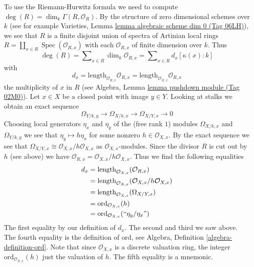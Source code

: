 \documentclass{amsart}
\theoremstyle{plain}
\theoremstyle{definition}
\theoremstyle{remark}
\numberwithin{equation}{subsection}
\def\Spec{\mathop{\mathrm{Spec}}}
\begin{document}
\medskip\noindent
To use the Riemann-Hurwitz formula we need to compute
$\deg(R) = \dim_k \Gamma(R, \mathcal{O}_R)$. By the structure
of zero dimensional schemes over $k$ (see for example
Varieties, Lemma \href{https://stacks.math.columbia.edu/tag/06LH}{lemma algebraic scheme dim 0 (Tag 06LH)}),
we see that $R$ is a finite disjoint union of spectra of
Artinian local rings $R = \coprod_{x \in R} \Spec(\mathcal{O}_{R, x})$
with each $\mathcal{O}_{R, x}$ of finite dimension over $k$. Thus
$$
\deg(R) = \sum\nolimits_{x \in R} \dim_k \mathcal{O}_{R, x} =
\sum\nolimits_{x \in R} d_x [\kappa(x) : k]
$$
with
$$
d_x = \text{length}_{\mathcal{O}_{R, x}} \mathcal{O}_{R, x} =
\text{length}_{\mathcal{O}_{X, x}} \mathcal{O}_{R, x}
$$
the multiplicity of $x$ in $R$
(see Algebra, Lemma \href{https://stacks.math.columbia.edu/tag/02M0}{lemma pushdown module (Tag 02M0)}).
Let $x \in X$ be a closed point with image $y \in Y$.
Looking at stalks we obtain an exact sequence
$$
\Omega_{Y/k, y} \to \Omega_{X/k, x} \to \Omega_{X/Y, x} \to 0
$$
Choosing local generators $\eta_x$ and $\eta_y$ of the
(free rank $1$) modules $\Omega_{X/k, x}$ and $\Omega_{Y/k, y}$
we see that
$
\eta_y \mapsto h \eta_x
$
for some nonzero $h \in \mathcal{O}_{X, x}$. By the exact sequence we see that
$\Omega_{X/Y, x} \cong \mathcal{O}_{X, x}/h\mathcal{O}_{X, x}$
as $\mathcal{O}_{X, x}$-modules. Since the divisor
$R$ is cut out by $h$ (see above) we have
$\mathcal{O}_{R, x} = \mathcal{O}_{X, x}/h\mathcal{O}_{X, x}$.
Thus we find the following equalities
\begin{align*}
d_x
& =
\text{length}_{\mathcal{O}_{X, x}}(\mathcal{O}_{R, x}) \\
& =
\text{length}_{\mathcal{O}_{X, x}}(\mathcal{O}_{X, x}/h\mathcal{O}_{X, x}) \\
& =
\text{length}_{\mathcal{O}_{X, x}}(\Omega_{X/Y, x}) \\
& =
\text{ord}_{\mathcal{O}_{X, x}}(h) \\
& =
\text{ord}_{\mathcal{O}_{X, x}}(``\eta_y/\eta_x")
\end{align*}
The first equality by our definition of $d_x$. The second and third
we saw above. The fourth equality is the definition of $\text{ord}$, see
Algebra, Definition \ref{algebra-definition-ord}. Note that since
$\mathcal{O}_{X, x}$ is a discrete valuation ring, the integer
$\text{ord}_{\mathcal{O}_{X, x}}(h)$ just the valuation of $h$.
The fifth equality is a mnemonic.
\end{document}
